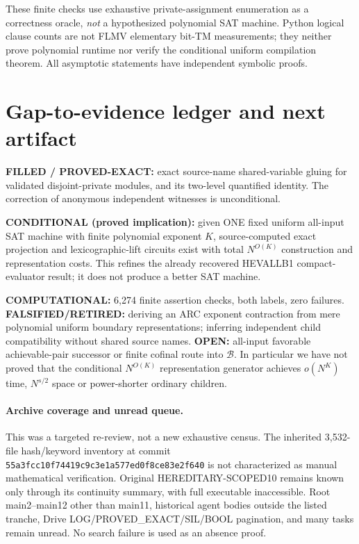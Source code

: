 \documentclass[11pt]{article}
\begin{document}
These finite checks use exhaustive private-assignment enumeration as a correctness oracle, \emph{not} a hypothesized polynomial SAT machine. Python logical clause counts are not FLMV elementary bit-TM measurements; they neither prove polynomial runtime nor verify the conditional uniform compilation theorem. All asymptotic statements have independent symbolic proofs.

\section{Gap-to-evidence ledger and next artifact}
\noindent\textbf{FILLED / PROVED-EXACT:} exact source-name shared-variable gluing for validated disjoint-private modules, and its two-level quantified identity. The correction of anonymous independent witnesses is unconditional.

\noindent\textbf{CONDITIONAL (proved implication):} given ONE fixed uniform all-input SAT machine with finite polynomial exponent \(K\), source-computed exact projection and lexicographic-lift circuits exist with total \(N^{O(K)}\) construction and representation costs. This refines the already recovered HEVALLB1 compact-evaluator result; it does not produce a better SAT machine.

\noindent\textbf{COMPUTATIONAL:} 6,274 finite assertion checks, both labels, zero failures. \textbf{FALSIFIED/RETIRED:} deriving an ARC exponent contraction from mere polynomial uniform boundary representations; inferring independent child compatibility without shared source names. \textbf{OPEN:} all-input favorable achievable-pair successor or finite cofinal route into \(\mathcal B\). In particular we have not proved that the conditional \(N^{O(K)}\) representation generator achieves \(o(N^K)\) time, \(N^{s/2}\) space or power-shorter ordinary children.

\paragraph{Archive coverage and unread queue.}
This was a targeted re-review, not a new exhaustive census. The inherited 3,532-file hash/keyword inventory at commit \texttt{55a3fcc10f74419c9c3e1a577ed0f8ce83e2f640} is not characterized as manual mathematical verification. Original HEREDITARY-SCOPED10 remains known only through its continuity summary, with full executable inaccessible. Root main2--main12 other than main11, historical agent bodies outside the listed tranche, Drive LOG/PROVED_EXACT/SIL/BOOL pagination, and many tasks remain unread. No search failure is used as an absence proof.
\end{document}
